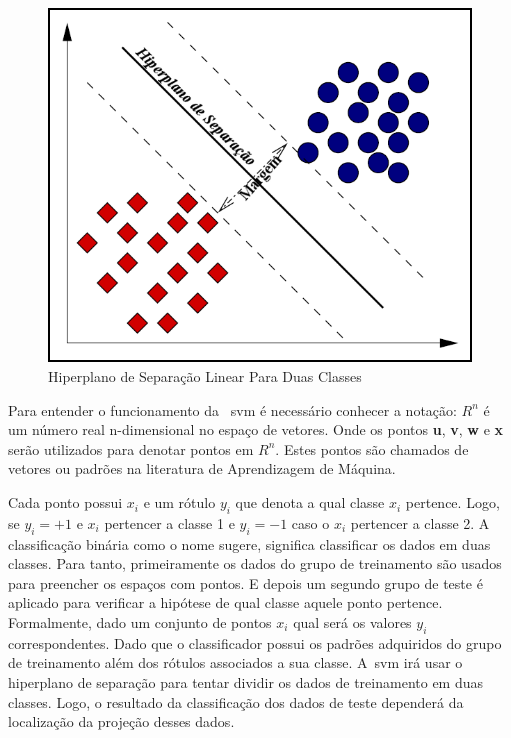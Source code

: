 \begin{figure}
 \centering
 \includegraphics[scale=0.4]{./img/svmhyperplane.png}
\caption{Hiperplano de Separação Linear Para Duas Classes}
 \label{fig:hiperplano}
\end{figure}


Para entender o funcionamento da ~\ac{svm} é necessário conhecer a notação:
\begin{math}
R^{n}
\end{math}
é um número real n-dimensional no espaço de vetores. Onde os pontos \textbf{u}, \textbf{v}, \textbf{w} e \textbf{x} serão utilizados para denotar pontos em 
\begin{math}
R^{n}
\end{math}.
Estes pontos são chamados de vetores ou padrões na literatura de Aprendizagem de Máquina.

Cada ponto possui $x_{i}$ e um rótulo $y_{i}$ que denota a qual classe $x_{i}$ pertence. Logo, se $y_{i} = + 1$ e $x_{i}$ pertencer a classe 1 e $y_{i} = - 1$ caso o $x_{i}$ pertencer a classe 2. A classificação binária como o nome sugere, significa classificar os dados em duas classes. Para tanto, primeiramente os dados do grupo de treinamento são usados para preencher os espaços com pontos. E depois um segundo grupo de teste é aplicado para verificar a hipótese de qual classe aquele ponto pertence. Formalmente, dado um conjunto de pontos $x_{i}$ qual será os valores $y_{i}$ correspondentes. Dado que o classificador possui os padrões adquiridos do grupo de treinamento além dos rótulos associados a sua classe. A~\ac{svm} irá usar o hiperplano de separação para tentar dividir os dados de treinamento em duas classes. Logo, o resultado da classificação dos dados de teste dependerá da localização da projeção desses dados.

